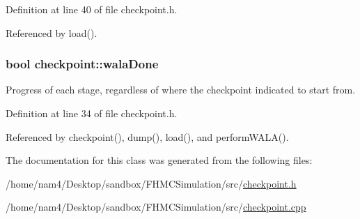 Definition at line 40 of file checkpoint.\-h.



Referenced by load().

\hypertarget{classcheckpoint_aab066479e2ca6656d0031dd46a2fc1a5}{
\subsubsection[{wala\-Done}]{\setlength{\rightskip}{0pt plus 5cm}bool checkpoint\-::wala\-Done}}\label{classcheckpoint_aab066479e2ca6656d0031dd46a2fc1a5}


Progress of each stage, regardless of where the checkpoint indicated to start from. 



Definition at line 34 of file checkpoint.\-h.



Referenced by checkpoint(), dump(), load(), and perform\-W\-A\-L\-A().



The documentation for this class was generated from the following files\-:\begin{DoxyCompactItemize}
\item 
/home/nam4/\-Desktop/sandbox/\-F\-H\-M\-C\-Simulation/src/\hyperlink{checkpoint_8h}{checkpoint.\-h}\item 
/home/nam4/\-Desktop/sandbox/\-F\-H\-M\-C\-Simulation/src/\hyperlink{checkpoint_8cpp}{checkpoint.\-cpp}\end{DoxyCompactItemize}
